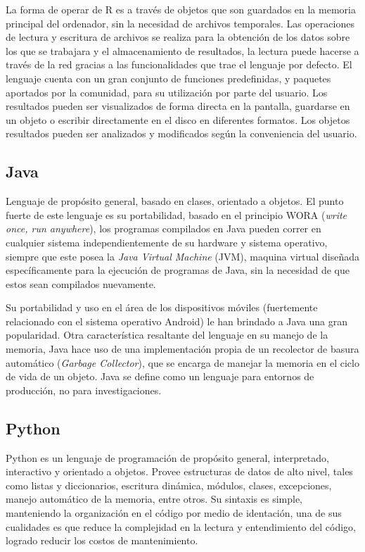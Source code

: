 La forma de operar de R es a través de objetos que son guardados en la memoria principal del ordenador, sin la necesidad de archivos temporales. Las operaciones de lectura y escritura de archivos se realiza para la obtención de los datos sobre los que se trabajara y el almacenamiento de resultados, la lectura puede hacerse a través de la red gracias a las funcionalidades que trae el lenguaje por defecto. El lenguaje cuenta con un gran conjunto de funciones predefinidas, y paquetes aportados por la comunidad, para su utilización por parte del usuario. Los resultados pueden ser visualizados de forma directa en la pantalla, guardarse en un objeto o escribir directamente en el disco en diferentes formatos. Los objetos resultados pueden ser analizados y modificados según la conveniencia del usuario.\cite{28-josemy}

\subsection{Java}

Lenguaje de propósito general, basado en clases, orientado a objetos. El punto fuerte de este lenguaje es su portabilidad, basado en el principio WORA (\emph{write once, run anywhere}), los programas compilados en Java pueden correr en cualquier sistema independientemente de su hardware y sistema operativo, siempre que este posea la \emph{Java Virtual Machine } (JVM), maquina virtual diseñada específicamente para la ejecución de programas de Java, sin la necesidad de que estos sean compilados nuevamente.\cite{25-josemy}

Su portabilidad y uso en el área de los dispositivos móviles (fuertemente relacionado con el sistema operativo Android) le han brindado a Java una gran popularidad. Otra característica resaltante del lenguaje en su manejo de la memoria, Java hace uso de una implementación propia de un recolector de basura
automático (\emph{Garbage Collector}), que se encarga de manejar la memoria en el ciclo de vida de un objeto. Java se define como un lenguaje para entornos de producción, no para investigaciones. \cite{25-josemy}

\subsection{Python}

Python es un lenguaje de programación de propósito general, interpretado, interactivo y orientado a objetos. Provee estructuras de datos de alto nivel, tales como listas y diccionarios, escritura dinámica, módulos, clases, excepciones, manejo automático de la memoria, entre otros. Su sintaxis es simple, manteniendo la organización en el código por medio de identación, una de sus cualidades es que reduce la complejidad en la lectura y entendimiento del código, logrado reducir los costos de mantenimiento.\cite{26-josemy,27-josemy}

